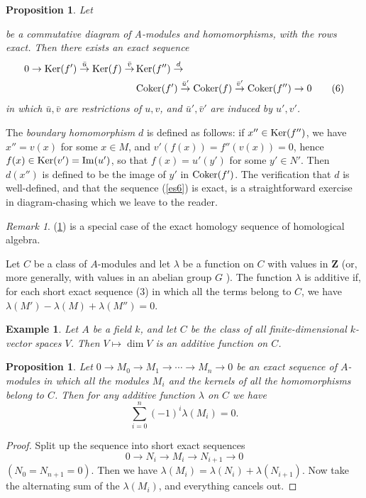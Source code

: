 \documentclass{standalone}
\newtheorem{proposition}[theorem]{Proposition}
\newtheorem*{example}{Example}
\theoremstyle{definition}
\theoremstyle{remark}
\newtheorem*{remark}{Remark}
\begin{document}
\begin{proposition}
  \label{prop:2.10}
  Let
  \begin{center}
\end{center}
be a commutative diagram of A-modules and homomorphisms, with the rows exact.
Then there exists an exact sequence
\begin{align*}
  \label{es6}
   0 \to \operatorname{Ker}(f') \stackrel{\bar{u}}{\to} \operatorname{Ker}(f) \stackrel{\bar{v}}{\to} &\operatorname{Ker}(f'') \stackrel{d}{\to} \\
   &\operatorname{Coker}(f') \stackrel{\bar{u}'}{\to} \operatorname{Coker}(f) \stackrel{\bar{v}'}{\to} \operatorname{Coker}(f'') \to 0\tag{6}
\end{align*}
in which $\bar{u}, \bar{v}$ are restrictions of $u, v$, and $\bar{u}', \bar{v}'$
are induced by $u', v'$.
\end{proposition}
The {\itshape boundary homomorphism} $d$ is defined as follows: if
$x'' \in \operatorname{Ker}(f'')$, we have $x''=v(x)$ for some $x \in M$, and
$v'(f(x))=f''(v(x))=0$, hence $f(x) \in \operatorname{Ker}(v')=\operatorname{Im}(u')$, so that
$f(x)=u'(y')$ for some $y' \in N'$. Then $d(x'')$ is defined to be the
image of $y'$ in $\operatorname{Coker}(f')$. The verification that $d$ is well-defined, and that the
sequence (\ref{es6}) is exact, is a straightforward exercise in diagram-chasing which we
leave to the reader.\qedsymbol
\begin{remark}
(\ref{prop:2.10}) is a special case of the exact homology sequence of homological
algebra.
\end{remark}
Let $C$ be a class of $A$-modules and let $\lambda$ be a function on $C$ with
values in $\mathbf{Z}$ (or, more generally, with values in an abelian group $G$
). The function $\lambda$ is additive if, for each short exact sequence (3) in
which all the terms belong to $C$, we have
$\lambda(M')-\lambda(M)+\lambda(M'')=0$.
\begin{example}
  Let $A$ be a field $k$, and let $C$ be the class of all
finite-dimensional $k$-vector spaces $V$. Then $V \mapsto \dim V$
is an additive function on $C$.
\end{example}
\begin{proposition}
  \label{prop:2.11}
  Let
$0 \to M_{0} \to M_{1} \to \cdots \to M_{n} \to 0$ be an exact sequence of
$A$-modules in which all the modules $M_{i}$ and the kernels of all the
homomorphisms belong to $C$. Then for any additive function $\lambda$ on $C$ we
have
\[
  \sum_{i=0}^{n}(-1)^{i} \lambda(M_{i})=0 .
\]
\end{proposition}
\begin{proof}
  Split up the sequence into short exact sequences
\[
  0 \to N_{i} \to M_{i} \to N_{i+1} \to 0
\]
$(N_{0}=N_{n+1}=0)$. Then we have
$\lambda(M_{i})=\lambda(N_{i})+\lambda(N_{i+1})$.
Now take the alternating sum of the $\lambda(M_{i})$, and everything
cancels out.
\end{proof}
\end{document}
